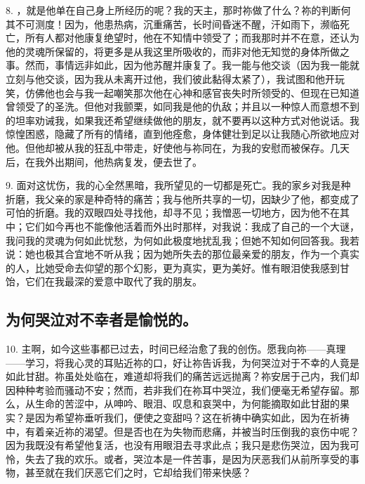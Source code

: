 8. ，就是他单在自己身上所经历的呢？我的天主，那时祢做了什么？祢的判断何其不可测度！因为，他患热病，沉重痛苦，长时间昏迷不醒，汗如雨下，濒临死亡，所有人都对他康复绝望时，他在不知情中领受了；而我那时并不在意，还认为他的灵魂所保留的，将更多是从我这里所吸收的，而非对他无知觉的身体所做之事。然而，事情远非如此，因为他苏醒并康复了。我一能与他交谈（因为我一能就立刻与他交谈，因为我从未离开过他，我们彼此黏得太紧了），我试图和他开玩笑，仿佛他也会与我一起嘲笑那次他在心神和感官丧失时所领受的、但现在已知道曾领受了的圣洗。但他对我颤栗，如同我是他的仇敌；并且以一种惊人而意想不到的坦率劝诫我，如果我还希望继续做他的朋友，就不要再以这种方式对他说话。我惊惶困惑，隐藏了所有的情绪，直到他痊愈，身体健壮到足以让我随心所欲地应对他。但他却被从我的狂乱中带走，好使他与祢同在，为我的安慰而被保存。几天后，在我外出期间，他热病复发，便去世了。\par

9. 面对这忧伤，我的心全然黑暗，我所望见的一切都是死亡。我的家乡对我是种折磨，我父亲的家是种奇特的痛苦；我与他所共享的一切，因缺少了他，都变成了可怕的折磨。我的双眼四处寻找他，却寻不见；我憎恶一切地方，因为他不在其中；它们如今再也不能像他活着而外出时那样，对我说：我成了自己的一个大谜，我问我的灵魂为何如此忧愁，为何如此极度地扰乱我；但她不知如何回答我。我若说：她也极其合宜地不听从我；因为她所失去的那位最亲爱的朋友，作为一个真实的人，比她受命去仰望的那个幻影，更为真实，更为美好。惟有眼泪使我感到甘饴，它们在我最深的爱意中取代了我的朋友。\par


\subsection{为何哭泣对不幸者是愉悦的。}

10. 主啊，如今这些事都已过去，时间已经治愈了我的创伤。愿我向祢——真理——学习，将我心灵的耳贴近祢的口，好让祢告诉我，为何哭泣对于不幸的人竟是如此甘甜。祢虽处处临在，难道却将我们的痛苦远远抛离？祢安居于己内，我们却因种种考验而骚动不安；然而，若非我们在祢耳中哭泣，我们便毫无希望存留。那么，从生命的苦涩中，从呻吟、眼泪、叹息和哀哭中，为何能摘取如此甘甜的果实？是因为希望祢垂听我们，便使之变甜吗？这在祈祷中确实如此，因为在祈祷中，有着亲近祢的渴望。但是否也在为失物而悲痛，并被当时压倒我的哀伤中呢？因为我既没有希望他复活，也没有用眼泪去寻求此点；我只是悲伤哭泣，因为我可怜，失去了我的欢乐。或者，哭泣本是一件苦事，是因为厌恶我们从前所享受的事物，甚至就在我们厌恶它们之时，它却给我们带来快感？\par

